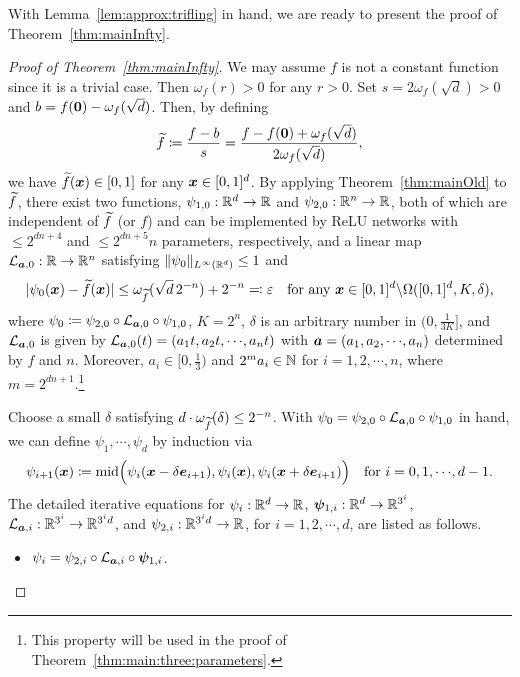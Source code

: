 \documentclass[nohyperref]{article}
\theoremstyle{plain}
\theoremstyle{definition}
\theoremstyle{remark}
\begin{document}
With Lemma~\ref{lem:approx:trifling} in hand, we are ready to present the proof of Theorem~\ref{thm:mainInfty}.
\begin{proof}[Proof of Theorem~\ref{thm:mainInfty}]
	We may assume $f$ is not a constant function  since it is a trivial case. 
	Then $\omega_f(r)>0$ for any $r>0$. Set $s=2\omega_f(\sqrt{d})>0$ and $b=f({\bm{0}})-\omega_f(\sqrt{d})$. Then, by defining 
	\begin{equation*}
		{\widetilde{f}}\coloneqq \frac{f-b}{s}=\frac{f-f({\bm{0}})+\omega_f(\sqrt{d})}{2\omega_f(\sqrt{d})},
	\end{equation*}
	we have ${\widetilde{f}}({\bm{x}})\in [0,1]$ for any ${\bm{x}}\in [0,1]^d$. 
	By applying Theorem~\ref{thm:mainOld} to ${\widetilde{f}}$, there exist two functions, $\psi_{1,0}:\R^d\to \R$ and $\psi_{2,0}:\R^n\to \R$, both of which are independent of ${\widetilde{f}}$ (or $f$) and can be implemented by ReLU networks with $\le 2^{dn+4}$ and $\le 2^{dn+5}n$ parameters, respectively, and a linear map $\calL_{\bma,0}:\R\to \R^n$ satisfying $\|\psi_0\|_{L^\infty(\R^d)}\le 1$  and
	\begin{equation*}
		|\psi_0({\bm{x}})-{\widetilde{f}}({\bm{x}})|\le \omega_{\widetilde{f}}(\sqrt{d}\, 2^{-n})+2^{-n}\eqqcolon \varepsilon\quad \textnormal{for any ${\bm{x}}\in [0,1]^d\backslash \Omega([0,1]^d,K,\delta)$,}
	\end{equation*}
	where $\psi_0\coloneqq \psi_{2,0}\circ {\mathcal{L}}_{{\bm{a}},0} \circ\psi_{1,0}$,
	$K=2^n$, $\delta$ is an arbitrary number in $(0,\tfrac{1}{3K}]$, and ${\mathcal{L}}_{{\bm{a}},0}$ is given by $\calL_{\bma,0}(t)=(a_1t, a_2 t,\cdots,a_n t)$ with $\bma=(a_1,a_2,\cdots,a_n)$ determined by $f$ and $n$. Moreover,
	$a_i\in[0,\tfrac{1}{3})$ and $2^m a_i\in\N$ for $i=1,2,\cdots,n$, where $m=2^{dn+1}$.\footnote{This property will be used in the proof of Theorem~\ref{thm:main:three:parameters}. }
	
	Choose a small $\delta$ satisfying $d\cdot \omega_{\widetilde{f}}(\delta)\le 2^{-n}$.
	With $\psi_0=\psi_{2,0}\circ {\mathcal{L}}_{{\bm{a}},0} \circ\psi_{1,0}$ in hand, we can define $\psi_1,\cdots,\psi_d$ by induction via 
	\begin{equation*}
		\psi_{i+1}(\bmx)\coloneqq \middleValue\Big(\psi_{i}(\bmx-\delta\bme_{i+1}),\psi_{i}(\bmx),\psi_{i}(\bmx+\delta\bme_{i+1})\Big)\quad \tn{for $i=0,1,\cdots,d-1$.}
	\end{equation*}
	The detailed iterative equations for $\psi_{i}:\R^d\to \R$, $\bmpsi_{1,i}:\R^d\to \R^{3^i}$, $\calL_{\bma,i}:\R^{3^i}\to \R^{3^i d}$, and $\psi_{2,i}:\R^{3^i d}\to \R$, 	for $i=1,2,\cdots,d$, are listed as follows.
	\begin{itemize}
		\item $\psi_{i}=\psi_{2,i}\circ {\mathcal{L}}_{{\bm{a}},i}\circ {\bm{\psi}}_{1,i}$.
		

\end{itemize}
\end{proof}
\end{document}
